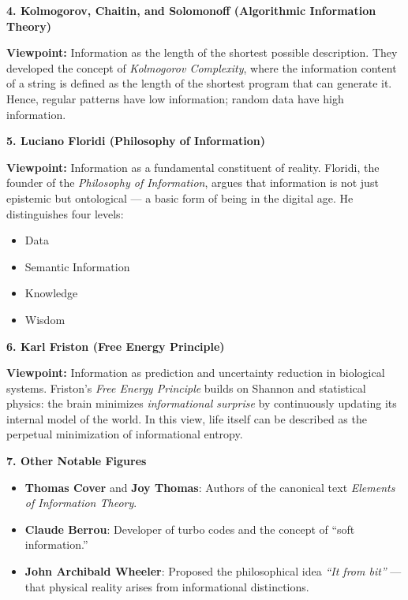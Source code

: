 \documentclass{book}
\providecommand{\ProjectDeepHeading}[2]{%
    \par\medskip\noindent\textbf{#2}\par\smallskip
}
\begin{document}
    \ProjectDeepHeading{3}{4. Kolmogorov, Chaitin, and Solomonoff (Algorithmic Information Theory)}
        \textbf{Viewpoint:} Information as the length of the shortest possible description.
        They developed the concept of \textit{Kolmogorov Complexity},
        where the information content of a string is defined as the length of the shortest program that can generate it.
        Hence, regular patterns have low information; random data have high information.
    
    \ProjectDeepHeading{3}{5. Luciano Floridi (Philosophy of Information)}
        \textbf{Viewpoint:} Information as a fundamental constituent of reality.
        Floridi, the founder of the \textit{Philosophy of Information}, argues that information is not just epistemic but ontological —
        a basic form of being in the digital age.
        He distinguishes four levels:
        \begin{itemize}
            \item Data
            \item Semantic Information
            \item Knowledge
            \item Wisdom
        \end{itemize}
    
    \ProjectDeepHeading{3}{6. Karl Friston (Free Energy Principle)}
        \textbf{Viewpoint:} Information as prediction and uncertainty reduction in biological systems.
        Friston’s \textit{Free Energy Principle} builds on Shannon and statistical physics:
        the brain minimizes \emph{informational surprise} by continuously updating its internal model of the world.
        In this view, life itself can be described as the perpetual minimization of informational entropy.
    
    \ProjectDeepHeading{3}{7. Other Notable Figures}
        \begin{itemize}
            \item \textbf{Thomas Cover} and \textbf{Joy Thomas}: Authors of the canonical text \textit{Elements of Information Theory}.
            \item \textbf{Claude Berrou}: Developer of turbo codes and the concept of ``soft information.''
            \item \textbf{John Archibald Wheeler}: Proposed the philosophical idea \textit{``It from bit''} — that physical reality arises from informational distinctions.
        \end{itemize}
    
\end{document}
